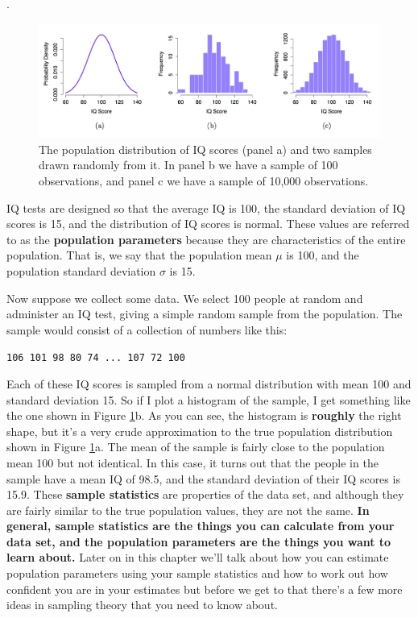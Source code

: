 \documentclass[]{book}
\begin{document}
.

\begin{figure}
\centering
\includegraphics{figures/navIQ.png}
\caption{\label{fig:IQdist}The population distribution of IQ scores (panel a) and two samples drawn randomly from it. In panel b we have a sample of 100 observations, and panel c we have a sample of 10,000 observations.}
\end{figure}

IQ tests are designed so that the average IQ is 100, the standard deviation of IQ scores is 15, and the distribution of IQ scores is normal. These values are referred to as the \textbf{population parameters} because they are characteristics of the entire population. That is, we say that the population mean \(\mu\) is 100, and the population standard deviation \(\sigma\) is 15.

Now suppose we collect some data. We select 100 people at random and administer an IQ test, giving a simple random sample from the population. The sample would consist of a collection of numbers like this:

\texttt{106\ 101\ 98\ 80\ 74\ ...\ 107\ 72\ 100}

Each of these IQ scores is sampled from a normal distribution with mean 100 and standard deviation 15. So if I plot a histogram of the sample, I get something like the one shown in Figure \ref{fig:IQdist}b. As you can see, the histogram is \textbf{roughly} the right shape, but it's a very crude approximation to the true population distribution shown in Figure \ref{fig:IQdist}a. The mean of the sample is fairly close to the population mean 100 but not identical. In this case, it turns out that the people in the sample have a mean IQ of 98.5, and the standard deviation of their IQ scores is 15.9. These \textbf{sample statistics} are properties of the data set, and although they are fairly similar to the true population values, they are not the same. \textbf{In general, sample statistics are the things you can calculate from your data set, and the population parameters are the things you want to learn about.} Later on in this chapter we'll talk about how you can estimate population parameters using your sample statistics and how to work out how confident you are in your estimates but before we get to that there's a few more ideas in sampling theory that you need to know about.
\end{document}
